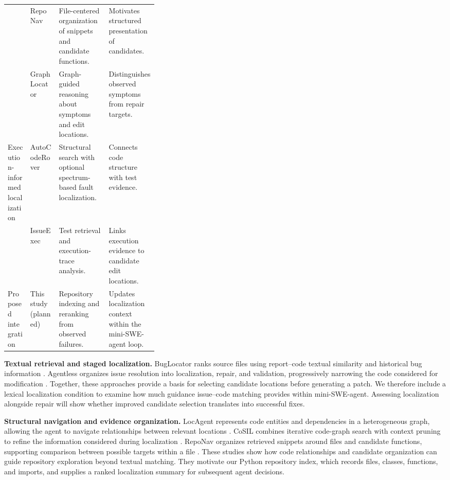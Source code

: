 \documentclass[11pt]{article}
\begin{document}
\begin{table}[H]
\begin{tabularx}{\linewidth}{
    @{}
    >{\raggedright\arraybackslash}p{0.15\linewidth}
    >{\raggedright\arraybackslash}p{0.19\linewidth}
    >{\raggedright\arraybackslash}X
    >{\raggedright\arraybackslash}X
    @{}
}
& RepoNav \cite{chai2026reponav}
& File-centered organization of snippets and candidate functions.
& Motivates structured presentation of candidates. \\

& GraphLocator \cite{liu2025graphlocator}
& Graph-guided reasoning about symptoms and edit locations.
& Distinguishes observed symptoms from repair targets. \\

\midrule

Execution-informed localization
& AutoCodeRover \cite{zhang2024autocoderover}
& Structural search with optional spectrum-based fault localization.
& Connects code structure with test evidence. \\

& IssueExec \cite{liu2026issueexec}
& Test retrieval and execution-trace analysis.
& Links execution evidence to candidate edit locations. \\

\midrule

Proposed integration
& This study (planned)
& Repository indexing and reranking from observed failures.
& Updates localization context within the mini-SWE-agent loop. \\

\bottomrule
\end{tabularx}
\end{table}

\textbf{Textual retrieval and staged localization.}
BugLocator ranks source files using report--code textual similarity
and historical bug information \cite{zhou2012buglocator}.
Agentless organizes issue resolution into localization, repair,
and validation, progressively narrowing the code considered for
modification \cite{xia2024agentless}.
Together, these approaches provide a basis for selecting candidate
locations before generating a patch.
We therefore include a lexical localization condition to examine
how much guidance issue--code matching provides within mini-SWE-agent.
Assessing localization alongside repair will show whether improved
candidate selection translates into successful fixes.

\textbf{Structural navigation and evidence organization.}
LocAgent represents code entities and dependencies in a heterogeneous
graph, allowing the agent to navigate relationships between relevant
locations \cite{chen2025locagent}.
CoSIL combines iterative code-graph search with context pruning
to refine the information considered during localization
\cite{jiang2025cosil}.
RepoNav organizes retrieved snippets around files and candidate
functions, supporting comparison between possible targets within
a file \cite{chai2026reponav}.
These studies show how code relationships and candidate organization
can guide repository exploration beyond textual matching.
They motivate our Python repository index, which records files,
classes, functions, and imports, and supplies a ranked localization
summary for subsequent agent decisions.
\end{document}
